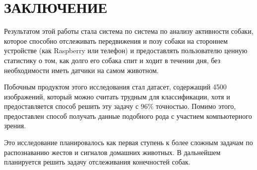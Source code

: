 \chapter*{ЗАКЛЮЧЕНИЕ}						%



Результатом этой работы стала система по система по анализу активности собаки, которое способно отслеживать передвижения и позу собаки на стороннем устройстве (как Raspberry или телефон) и предоставлять пользователю ценную статистику о том, как долго его собака спит и ходит в течении дня, без необходимости иметь датчики на самом животном.

Побочным продуктом этого исследования стал датасет, содержащий 4500 изображений, который можно считать трудным для классификации, хотя и предоставляется способ решить эту задачу с 96\% точностью. Помимо этого, предоставлен способ получать данные подобного рода с участием компьютерного зрения. 

Это исследование планировалось как первая ступень к более сложным задачам по распознаванию жестов и сигналов домашних животных. В дальнейшем планируется решить задачу отслеживания конечностей собак.